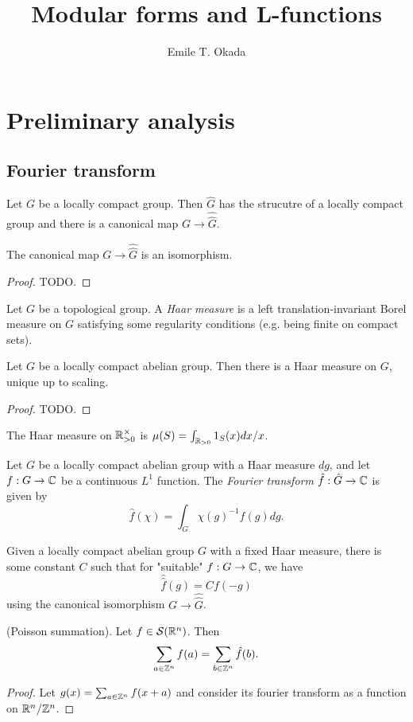\documentclass{memoir}
\title{Modular forms and L-functions}
\author{Emile T. Okada}
\begin{document}
\maketitle
\tableofcontents
\chapter{Preliminary analysis}
\section{Fourier transform}
Let $G$ be a locally compact group. Then $\hat G$ has the strucutre of a locally compact group and there is a canonical map $G\to\hat\hat G$.
\begin{thm}
    The canonical map $G\to\hat{\hat G}$ is an isomorphism.
\end{thm}
\begin{proof}
    TODO.
\end{proof}
\begin{definition}
    Let $G$ be a topological group. A \textit{Haar measure} is a left translation-invariant Borel measure on $G$ satisfying some regularity conditions (e.g. being finite on compact sets).
\end{definition}
\begin{thm}
    Let $G$ be a locally compact abelian group. Then there is a Haar measure on $G$, unique up to scaling.
\end{thm}
\begin{proof}
    TODO.
\end{proof}
\begin{example}
    The Haar measure on $\mathbb{R}_{>0}^\times$ is $\mu(S) = \int_{\mathbb{R}_{>0}}1_S(x)dx/x$.
\end{example}
\begin{definition}
    Let $G$ be a locally compact abelian group with a Haar measure $dg$, and let $f:G\to\mathbb{C}$ be a continuous $L^1$ function. The \textit{Fourier transform} $\hat f:\hat G\to\mathbb{C}$ is given by
    \begin{equation}
        \hat f(\chi) = \int_G \chi(g)^{-1}f(g)dg.
    \end{equation}
\end{definition}
\begin{thm}
    Given a locally compact abelian group $G$ with a fixed Haar measure, there is some constant $C$ such that for "suitable" $f:G\to \mathbb{C}$, we have
    \begin{equation}
        \hat{\hat f}(g) = C f(-g)
    \end{equation}
    using the canonical isomorphism $G\to\hat{\hat G}$.
\end{thm}
\begin{thm}
    (Poisson summation). 
    Let $f\in \mathcal S(\mathbb{R}^n)$. Then
    \begin{equation}
        \sum_{a\in \mathbb{Z}^n} f(a) = \sum_{b\in \mathbb{Z}^n} \hat f(b).
    \end{equation}
\end{thm}
\begin{proof}
    Let $g(x) = \sum_{a\in \mathbb{Z}^n}f(x+a)$ and consider its fourier transform as a function on $\mathbb{R}^n/\mathbb{Z}^n$.
\end{proof}
\end{document}
